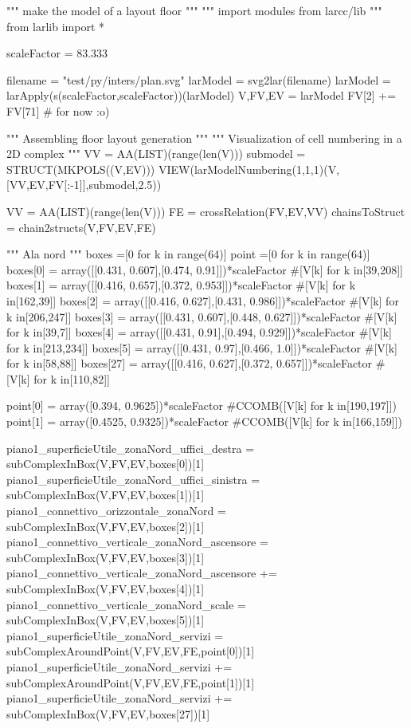 """ make the model of a layout floor """
""" import modules from larcc/lib """
from larlib import *

scaleFactor = 83.333

filename = "test/py/inters/plan.svg"
larModel = svg2lar(filename)
larModel = larApply(s(scaleFactor,scaleFactor))(larModel)
V,FV,EV = larModel
FV[2] += FV[71]      # for now :o)

""" Assembling floor layout generation """
""" Visualization of cell numbering in a 2D complex """
VV = AA(LIST)(range(len(V)))
submodel = STRUCT(MKPOLS((V,EV)))
VIEW(larModelNumbering(1,1,1)(V,[VV,EV,FV[:-1]],submodel,2.5))

VV = AA(LIST)(range(len(V)))
FE = crossRelation(FV,EV,VV)
chainsToStruct = chain2structs(V,FV,EV,FE)

""" Ala nord """
boxes =[0 for k in range(64)]
point =[0 for k in range(64)]
boxes[0] = array([[0.431, 0.607],[0.474, 0.91]])*scaleFactor #[V[k] for k in[39,208]]
boxes[1] = array([[0.416, 0.657],[0.372, 0.953]])*scaleFactor #[V[k] for k in[162,39]]
boxes[2] = array([[0.416, 0.627],[0.431, 0.986]])*scaleFactor #[V[k] for k in[206,247]]
boxes[3] = array([[0.431, 0.607],[0.448, 0.627]])*scaleFactor #[V[k] for k in[39,7]]
boxes[4] = array([[0.431, 0.91],[0.494, 0.929]])*scaleFactor  #[V[k] for k in[213,234]]
boxes[5] = array([[0.431, 0.97],[0.466, 1.0]])*scaleFactor #[V[k] for k in[58,88]]
boxes[27] = array([[0.416, 0.627],[0.372, 0.657]])*scaleFactor #[V[k] for k in[110,82]]

point[0] = array([0.394, 0.9625])*scaleFactor #CCOMB([V[k] for k in[190,197]])
point[1] = array([0.4525, 0.9325])*scaleFactor #CCOMB([V[k] for k in[166,159]])

piano1_superficieUtile_zonaNord_uffici_destra = subComplexInBox(V,FV,EV,boxes[0])[1]
piano1_superficieUtile_zonaNord_uffici_sinistra = subComplexInBox(V,FV,EV,boxes[1])[1]
piano1_connettivo_orizzontale_zonaNord = subComplexInBox(V,FV,EV,boxes[2])[1]
piano1_connettivo_verticale_zonaNord_ascensore = subComplexInBox(V,FV,EV,boxes[3])[1]
piano1_connettivo_verticale_zonaNord_ascensore += subComplexInBox(V,FV,EV,boxes[4])[1]
piano1_connettivo_verticale_zonaNord_scale = subComplexInBox(V,FV,EV,boxes[5])[1]
piano1_superficieUtile_zonaNord_servizi = subComplexAroundPoint(V,FV,EV,FE,point[0])[1]
piano1_superficieUtile_zonaNord_servizi += subComplexAroundPoint(V,FV,EV,FE,point[1])[1]
piano1_superficieUtile_zonaNord_servizi += subComplexInBox(V,FV,EV,boxes[27])[1]

